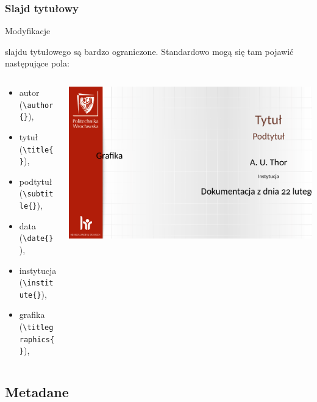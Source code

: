 \begin{frame}[fragile]
 \frametitle<presentation>{Slajd tytułowy}
 \hypertarget{tytul}{Modyfikacje} slajdu tytułowego są bardzo ograniczone. Standardowo mogą się tam pojawić następujące pola:
 \begin{columns}
  \begin{column}{.5\textwidth}
   \begin{itemize}
    \item
          autor (\lstinline|\author{}|),
    \item
          tytuł (\lstinline|\title{}|),
    \item
          podtytuł (\lstinline|\subtitle{}|),
    \item
          data (\lstinline|\date{}|),
    \item
          instytucja (\lstinline|\institute{}|),
    \item
          grafika (\lstinline|\titlegraphics{}|),
   \end{itemize}
  \end{column}
  \begin{column}{.48\textwidth}
     \includegraphics[width=.6\textwidth]{metadane}

  \end{column}
 \end{columns}
\end{frame}



\subsection{Metadane}

